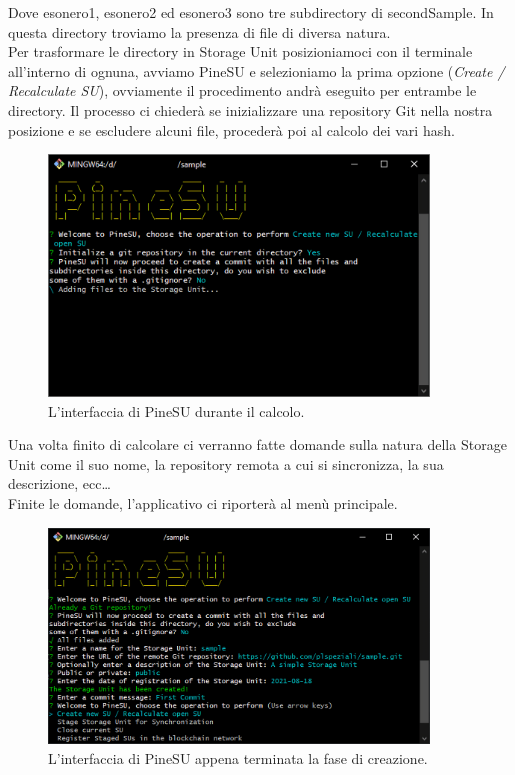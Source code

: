 Dove \textsf{esonero1}, \textsf{esonero2} ed \textsf{esonero3} sono tre subdirectory di \textsf{secondSample}.
In questa directory troviamo la presenza di file di diversa natura. \\


Per trasformare le directory in Storage Unit posizioniamoci con il terminale all'interno di ognuna,
avviamo PineSU e selezioniamo la prima opzione (\emph{Create / Recalculate SU}),
ovviamente il procedimento andrà eseguito per entrambe le directory.
Il processo ci chiederà se inizializzare una repository Git nella nostra posizione e se escludere alcuni file,
procederà poi al calcolo dei vari hash.

\begin{figure}[H]
    \centering
    \includegraphics[width=0.9\textwidth]{Figures/calculating}
    \caption{\small{
    L'interfaccia di PineSU durante il calcolo.
    } %
    } %
    \label{fi:calc}
\end{figure}


Una volta finito di calcolare ci verranno fatte domande sulla natura della Storage Unit come il suo nome,
la repository remota a cui si sincronizza, la sua descrizione, ecc\dots \\
Finite le domande, l'applicativo ci riporterà al menù principale.

\begin{figure}[H]
    \centering
    \includegraphics[width=0.9\textwidth]{Figures/doneCalculating}
    \caption{\small{
    L'interfaccia di PineSU appena terminata la fase di creazione.
    } %
    } %
    \label{fi:dcalc}
\end{figure}

